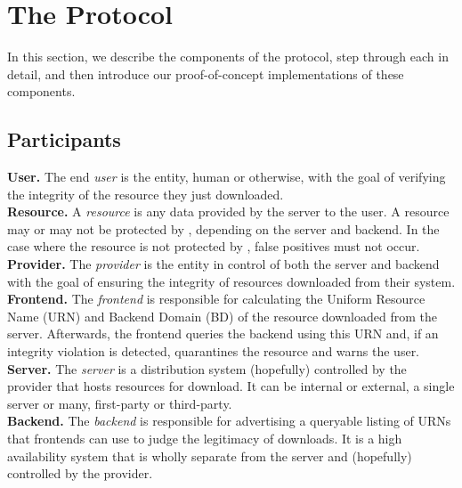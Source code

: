 \section{The \SYSTEM{} Protocol} \label{sec:approach}


In this section, we describe the components of the \SYSTEM{} protocol, step
through each in detail, and then introduce our proof-of-concept implementations
of these components.

\subsection{Participants}

\noindent\textbf{User.} The end \emph{user} is the entity, human or otherwise,
with the goal of verifying the integrity of the resource they just downloaded.
\\

\noindent\textbf{Resource.} A \emph{resource} is any data provided by the server
to the user. A resource may or may not be protected by \SYSTEM{}, depending on
the server and backend. In the case where the resource is not protected by
\SYSTEM{}, false positives must not occur. \\

\noindent\textbf{Provider.} The \emph{provider} is the entity in control of both
the server and backend with the goal of ensuring the integrity of resources
downloaded from their system. \\

\noindent\textbf{\SYSTEM{} Frontend.} The \emph{frontend} is responsible for
calculating the Uniform Resource Name (URN) and Backend Domain (BD) of the
resource downloaded from the server. Afterwards, the frontend queries the
backend using this URN and, if an integrity violation is detected, quarantines
the resource and warns the user. \\

\noindent\textbf{Server.} The \emph{server} is a distribution system (hopefully)
controlled by the provider that hosts resources for download. It can be internal
or external, a single server or many, first-party or third-party. \\

\noindent\textbf{\SYSTEM{} Backend.} The \emph{backend} is responsible for
advertising a queryable listing of URNs that \SYSTEM{} frontends can use to
judge the legitimacy of downloads. It is a high availability system that is
wholly separate from the server and (hopefully) controlled by the provider.

